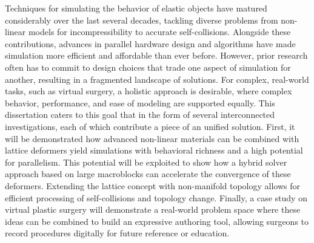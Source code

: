 
Techniques for simulating the behavior of elastic objects have matured
considerably over the last several decades, tackling diverse problems
from non-linear models for incompressibility to accurate
self-collisions. Alongside these contributions, advances in parallel
hardware design and algorithms have made simulation more efficient and
affordable than ever before. However, prior research often has to
commit to design choices that trade one aspect of simulation for another,
resulting in a fragmented landscape of solutions. For complex,
real-world tasks, such as virtual surgery, a holistic approach is
desirable, where complex behavior, performance, and ease of modeling
are supported equally. This dissertation caters to this goal that in the
form of several interconnected investigations, each of which
contribute a piece of an unified solution. First, it will be
demonstrated how advanced non-linear materials can be combined with
lattice deformers yield simulations with behavioral richness and a
high potential for parallelism. This potential will be exploited to
show how a hybrid solver approach based on large macroblocks can
accelerate the convergence of these deformers. Extending the lattice
concept with non-manifold topology allows for efficient processing of
self-collisions and topology change. Finally, a case study on virtual
plastic surgery will demonstrate a real-world problem space where
these ideas can be combined to build an expressive authoring tool,
allowing surgeons to record procedures digitally for future reference
or education.


